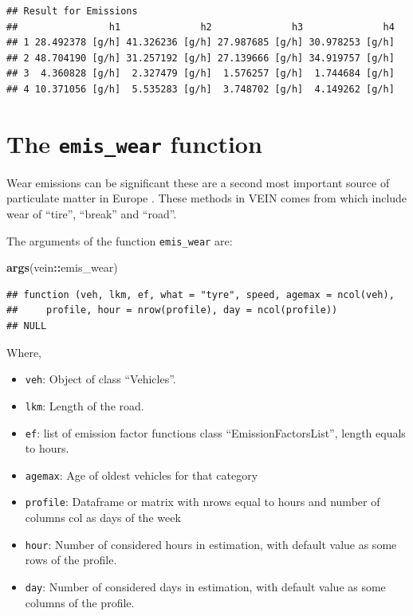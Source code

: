 \documentclass[12pt,graybox,envcountchap,sectrefs]{krantz}
\makeatletter
\newenvironment{Shaded}{\begin{snugshade}}{\end{snugshade}}
\newcommand{\KeywordTok}[1]{\textcolor[rgb]{0.13,0.29,0.53}{\textbf{#1}}}
\newcommand{\OperatorTok}[1]{\textcolor[rgb]{0.81,0.36,0.00}{\textbf{#1}}}
\newcommand{\NormalTok}[1]{#1}
\providecommand{\tightlist}{%
  \setlength{\itemsep}{0pt}\setlength{\parskip}{0pt}}
\newenvironment{kframe}{%
\medskip{}
\setlength{\fboxsep}{.8em}
 \def\at@end@of@kframe{}%
 \ifinner\ifhmode%
  \def\at@end@of@kframe{\end{minipage}}%
  \begin{minipage}{\columnwidth}%
 \fi\fi%
 \def\FrameCommand##1{\hskip\@totalleftmargin \hskip-\fboxsep
 \colorbox{shadecolor}{##1}\hskip-\fboxsep
     \hskip-\linewidth \hskip-\@totalleftmargin \hskip\columnwidth}%
 \MakeFramed {\advance\hsize-\width
   \@totalleftmargin\z@ \linewidth\hsize
   \@setminipage}}%
 {\par\unskip\endMakeFramed%
 \at@end@of@kframe}
\renewenvironment{Shaded}{\begin{kframe}}{\end{kframe}}
\theoremstyle{definition}
\theoremstyle{definition}
\theoremstyle{definition}
\theoremstyle{remark}
\makeatother
\begin{document}
\begin{verbatim}
## Result for Emissions 
##                h1              h2              h3              h4
## 1 28.492378 [g/h] 41.326236 [g/h] 27.987685 [g/h] 30.978253 [g/h]
## 2 48.704190 [g/h] 31.257192 [g/h] 27.139666 [g/h] 34.919757 [g/h]
## 3  4.360828 [g/h]  2.327479 [g/h]  1.576257 [g/h]  1.744684 [g/h]
## 4 10.371056 [g/h]  5.535283 [g/h]  3.748702 [g/h]  4.149262 [g/h]
\end{verbatim}

\section{\texorpdfstring{The \texttt{emis\_wear}
function}{The emis\_wear function}}\label{ew}

Wear emissions can be significant these are a second most important
source of particulate matter in Europe \citep{eear}. These methods in
VEIN comes from \citet{NtziachristosBoulter2009} which include wear of
``tire'', ``break'' and ``road''.

The arguments of the function \texttt{emis\_wear} are:

\begin{Shaded}
\begin{Highlighting}[]
\KeywordTok{args}\NormalTok{(vein}\OperatorTok{::}\NormalTok{emis_wear)}
\end{Highlighting}
\end{Shaded}

\begin{verbatim}
## function (veh, lkm, ef, what = "tyre", speed, agemax = ncol(veh), 
##     profile, hour = nrow(profile), day = ncol(profile)) 
## NULL
\end{verbatim}

Where,

\begin{itemize}
\tightlist
\item
  \texttt{veh}: Object of class ``Vehicles''.
\item
  \texttt{lkm}: Length of the road.
\item
  \texttt{ef}: list of emission factor functions class
  ``EmissionFactorsList'', length equals to hours.
\item
  \texttt{agemax}: Age of oldest vehicles for that category
\item
  \texttt{profile}: Dataframe or matrix with nrows equal to hours and
  number of columns col as days of the week
\item
  \texttt{hour}: Number of considered hours in estimation, with default
  value as some rows of the profile.
\item
  \texttt{day}: Number of considered days in estimation, with default
  value as some columns of the profile.
\end{itemize}
\end{document}
